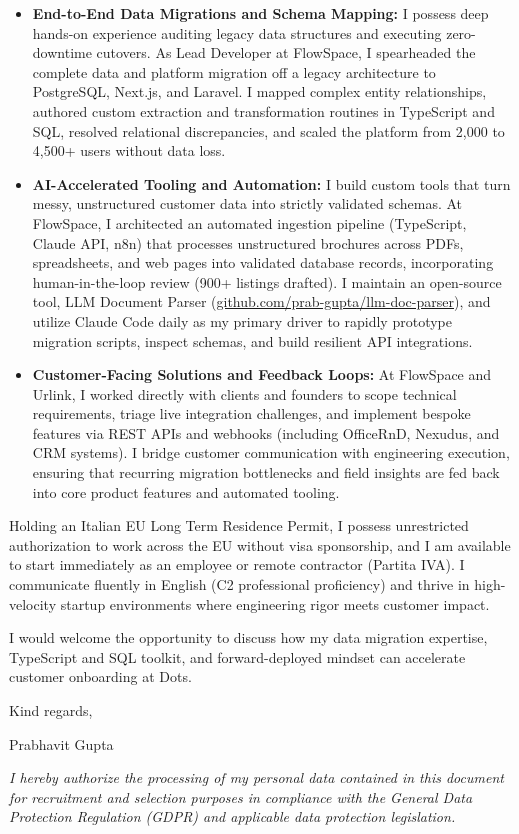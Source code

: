 \documentclass[10.5pt,a4paper]{article}
\begin{document}
\begin{itemize}
  \setlength{\itemsep}{1pt}
  \setlength{\parskip}{0pt}
  \item \textbf{End-to-End Data Migrations and Schema Mapping:} I possess deep hands-on experience auditing legacy data structures and executing zero-downtime cutovers. As Lead Developer at FlowSpace, I spearheaded the complete data and platform migration off a legacy architecture to PostgreSQL, Next.js, and Laravel. I mapped complex entity relationships, authored custom extraction and transformation routines in TypeScript and SQL, resolved relational discrepancies, and scaled the platform from 2,000 to 4,500+ users without data loss.
  \item \textbf{AI-Accelerated Tooling and Automation:} I build custom tools that turn messy, unstructured customer data into strictly validated schemas. At FlowSpace, I architected an automated ingestion pipeline (TypeScript, Claude API, n8n) that processes unstructured brochures across PDFs, spreadsheets, and web pages into validated database records, incorporating human-in-the-loop review (900+ listings drafted). I maintain an open-source tool, LLM Document Parser (\href{https://github.com/prab-gupta/llm-doc-parser}{github.com/prab-gupta/llm-doc-parser}), and utilize Claude Code daily as my primary driver to rapidly prototype migration scripts, inspect schemas, and build resilient API integrations.
  \item \textbf{Customer-Facing Solutions and Feedback Loops:} At FlowSpace and Urlink, I worked directly with clients and founders to scope technical requirements, triage live integration challenges, and implement bespoke features via REST APIs and webhooks (including OfficeRnD, Nexudus, and CRM systems). I bridge customer communication with engineering execution, ensuring that recurring migration bottlenecks and field insights are fed back into core product features and automated tooling.
\end{itemize}

Holding an Italian EU Long Term Residence Permit, I possess unrestricted authorization to work across the EU without visa sponsorship, and I am available to start immediately as an employee or remote contractor (Partita IVA). I communicate fluently in English (C2 professional proficiency) and thrive in high-velocity startup environments where engineering rigor meets customer impact.

I would welcome the opportunity to discuss how my data migration expertise, TypeScript and SQL toolkit, and forward-deployed mindset can accelerate customer onboarding at Dots.

Kind regards,

Prabhavit Gupta

\vspace{0.3em}
{\footnotesize \textit{I hereby authorize the processing of my personal data contained in this document for recruitment and selection purposes in compliance with the General Data Protection Regulation (GDPR) and applicable data protection legislation.}\par}
\end{document}
